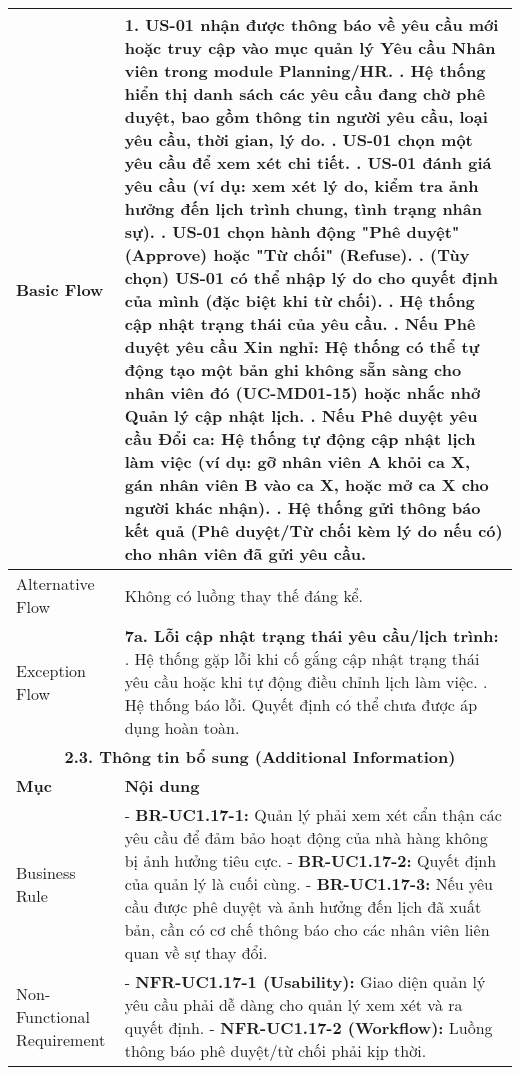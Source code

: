\begin{longtable}{|m{4cm}|p{11cm}|}
Basic Flow & 1. US-01 nhận được thông báo về yêu cầu mới hoặc truy cập vào mục quản lý Yêu cầu Nhân viên trong module Planning/HR. \newline 2. Hệ thống hiển thị danh sách các yêu cầu đang chờ phê duyệt, bao gồm thông tin người yêu cầu, loại yêu cầu, thời gian, lý do. \newline 3. US-01 chọn một yêu cầu để xem xét chi tiết. \newline 4. US-01 đánh giá yêu cầu (ví dụ: xem xét lý do, kiểm tra ảnh hưởng đến lịch trình chung, tình trạng nhân sự). \newline 5. US-01 chọn hành động "Phê duyệt" (Approve) hoặc "Từ chối" (Refuse). \newline 6. (Tùy chọn) US-01 có thể nhập lý do cho quyết định của mình (đặc biệt khi từ chối). \newline 7. Hệ thống cập nhật trạng thái của yêu cầu. \newline 8. Nếu Phê duyệt yêu cầu Xin nghỉ: Hệ thống có thể tự động tạo một bản ghi không sẵn sàng cho nhân viên đó (UC-MD01-15) hoặc nhắc nhở Quản lý cập nhật lịch. \newline 9. Nếu Phê duyệt yêu cầu Đổi ca: Hệ thống tự động cập nhật lịch làm việc (ví dụ: gỡ nhân viên A khỏi ca X, gán nhân viên B vào ca X, hoặc mở ca X cho người khác nhận). \newline 10. Hệ thống gửi thông báo kết quả (Phê duyệt/Từ chối kèm lý do nếu có) cho nhân viên đã gửi yêu cầu. \\
\hline
Alternative Flow & Không có luồng thay thế đáng kể. \\
\hline
Exception Flow & \textbf{7a. Lỗi cập nhật trạng thái yêu cầu/lịch trình:} \newline    1. Hệ thống gặp lỗi khi cố gắng cập nhật trạng thái yêu cầu hoặc khi tự động điều chỉnh lịch làm việc. \newline    2. Hệ thống báo lỗi. Quyết định có thể chưa được áp dụng hoàn toàn. \\
\hline
\multicolumn{2}{|c|}{\textbf{2.3. Thông tin bổ sung (Additional Information)}} \\
\hline
\textbf{Mục} & \textbf{Nội dung} \\
\hline
Business Rule & - \textbf{BR-UC1.17-1:} Quản lý phải xem xét cẩn thận các yêu cầu để đảm bảo hoạt động của nhà hàng không bị ảnh hưởng tiêu cực. \newline - \textbf{BR-UC1.17-2:} Quyết định của quản lý là cuối cùng. \newline - \textbf{BR-UC1.17-3:} Nếu yêu cầu được phê duyệt và ảnh hưởng đến lịch đã xuất bản, cần có cơ chế thông báo cho các nhân viên liên quan về sự thay đổi. \\
\hline
Non-Functional Requirement & - \textbf{NFR-UC1.17-1 (Usability):} Giao diện quản lý yêu cầu phải dễ dàng cho quản lý xem xét và ra quyết định. \newline - \textbf{NFR-UC1.17-2 (Workflow):} Luồng thông báo phê duyệt/từ chối phải kịp thời. \\
\hline
\end{longtable}


